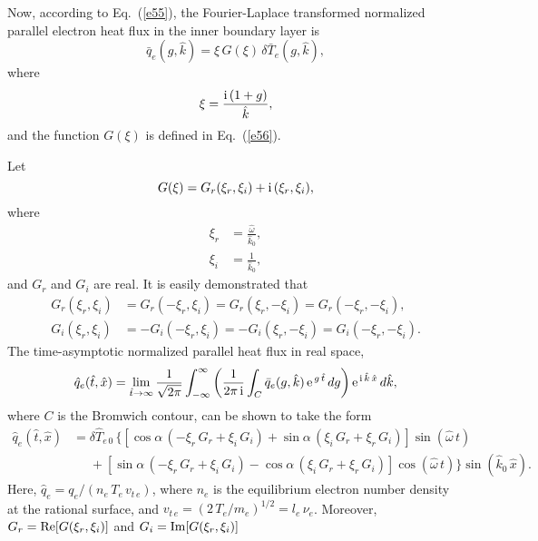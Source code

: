 \documentclass[12pt,prb,aps]{revtex4-1}
\begin{document}
Now, according to Eq.~(\ref{e55}), the Fourier-Laplace transformed normalized parallel electron heat flux in the inner boundary layer is
\begin{equation}
\bar{q}_e(g,\hat{k}) = \xi\,G(\xi)\,\delta\bar{T}_e(g,\hat{k}),
\end{equation}
where
\begin{equation}
\xi= \frac{{\rm i}\,(1+g)}{\hat{k}},
\end{equation}
and the function $G(\xi)$ is defined in Eq.~(\ref{e56}). 

Let
\begin{equation}
G(\xi) = G_r(\xi_r,\xi_i) + {\rm i}\,(\xi_r,\xi_i),
\end{equation}
where
\begin{align}
\xi_r &= \frac{\hat{\omega}}{\hat{k}_0},\\[0.5ex]
\xi_i&= \frac{1}{\hat{k}_0},
\end{align}
and $G_r$ and $G_i$ are real. It is easily demonstrated that
\begin{align}
G_r(\xi_r,\xi_i)&= G_r(-\xi_r,\xi_i)= G_r(\xi_r,-\xi_i)=G_r(-\xi_r,-\xi_i),\\[0.5ex]
G_i(\xi_r,\xi_i)&=- G_i(-\xi_r,\xi_i)= -G_i(\xi_r,-\xi_i)=G_i(-\xi_r,-\xi_i).
\end{align}
The time-asymptotic normalized parallel heat flux in real space,
\begin{equation}
\hat{q}_e(\hat{t},\hat{x}) = \lim_{\hat{t}\rightarrow\infty}\frac{1}{\sqrt{2\pi}}\int_{-\infty}^{\infty}
\left(\frac{1}{2\pi\,{\rm i}}\int_C \bar{q}_e(g,\hat{k})\,{\rm e}^{\,g\,\hat{t}}\,dg\right){\rm e}^{\,{\rm i}\,\hat{k}\,\hat{x}}\,d\hat{k},
\end{equation}
where $C$ is the Bromwich contour, can be shown to take the form 
\begin{align}
\hat{q}_e(\hat{t},\hat{x}) &= \delta\hat{T}_{e\,0}\,\{\left[\cos\alpha\,(-\xi_r\,G_r+\xi_i\,G_i)+\sin\alpha\,(\xi_i\,G_r+\xi_r\,G_i)\right]\sin(\hat{\omega}\,t)\nonumber\\[0.5ex]
&\phantom{=}+\left[\sin\alpha\,(-\xi_r\,G_r+\xi_i\,G_i)-\cos\alpha\,(\xi_i\,G_r+\xi_r\,G_i)\right]\cos(\hat{\omega}\,t)\}\sin(\hat{k}_0\,\hat{x}).
\end{align}
Here, $\hat{q}_e = q_e/(n_e\,T_e\,v_{t\,e})$, where $n_e$ is the equilibrium electron number density at the rational surface, and $v_{t\,e}= (2\,T_e/m_e)^{1/2}= l_e\,\nu_e$. 
Moreover, $G_r= {\rm Re}[G(\xi_r,\xi_i)]$ and $G_i= {\rm Im}[G(\xi_r,\xi_i)]$
\end{document}
